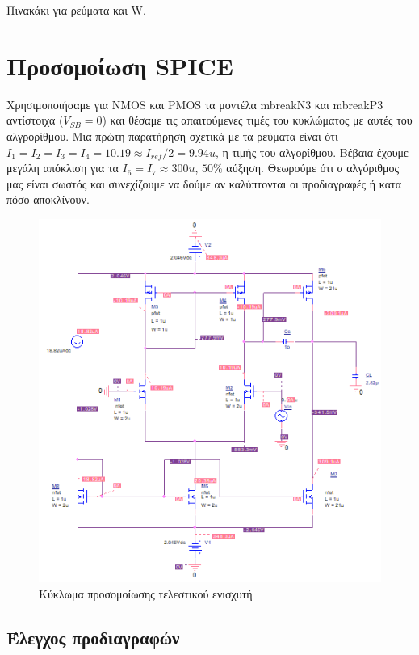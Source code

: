 \documentclass[12pt, a4paper]{article}
\begin{document}
Πινακάκι για ρεύματα και W.

\section{Προσομοίωση SPICE}

Χρησιμοποιήσαμε για NMOS και PMOS τα μοντέλα mbreakN3 και mbreakP3 αντίστοιχα ($V_{SB} = 0$) και θέσαμε τις απαιτούμενες τιμές του κυκλώματος με αυτές του αλγρορίθμου. Μια πρώτη παρατήρηση σχετικά με τα ρεύματα είναι ότι $I_1 = I_2 = I_3 = I_4 = 10.19 \approx I_{ref}/2 = 9.94u$, η τιμής του αλγορίθμου. Βέβαια έχουμε μεγάλη απόκλιση για τα $I_6 = I_7 \approx 300u$, $50\%$ αύξηση. Θεωρούμε ότι ο αλγόριθμος μας είναι σωστός και συνεχίζουμε να δούμε αν καλύπτονται οι προδιαγραφές ή κατα πόσο αποκλίνουν.

\begin{figure}[h!]
	\centering
	\includegraphics[width = \textwidth, height = .4\textheight, keepaspectratio]{assets/base.png}
	\caption{Κύκλωμα προσομοίωσης τελεστικού ενισχυτή}
\end{figure}

\subsection{Έλεγχος προδιαγραφών}
\end{document}

